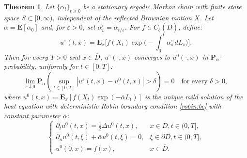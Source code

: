 \documentclass[10pt,a4paper]{amsart}
\newtheorem{theorem}{Theorem}
\begin{document}
\begin{theorem}\label{thm:averaging}
	Let $\{\alpha_t\}_{t\geq 0}$ be a stationary ergodic Markov chain with finite state space $S \subset [0, \infty)$, independent of the reflected Brownian motion $X$. Let $\bar\alpha=\mathbf E[\alpha_0]$ and, for $\varepsilon>0$, set $\alpha^\varepsilon_t=\alpha_{t/\varepsilon}$. For $f\in C_b(\overline D)$, define:
	\[
	u^\varepsilon(t,x)=\mathbf E_x\Big[f(X_t)\exp\Big(-\int_0^t\alpha^\varepsilon_s\,dL_s\Big)\Big].
	\]
	Then for every $T>0$ and $x\in\overline D$, $u^\varepsilon(\cdot,x)$ converges to $u^0(\cdot,x)$ in $\mathbf{P}_\alpha$-probability, uniformly for $t \in [0,T]$:
	\[
	\lim_{\varepsilon\downarrow 0} \mathbf{P}_\alpha \left( \sup_{t \in [0,T]} |u^\varepsilon(t,x) - u^0(t,x)| > \delta \right) = 0 \quad \text{for every } \delta > 0,
	\]
	where $u^0(t,x)=\mathbf{E}_x[f(X_t) \exp(-\bar \alpha L_t)]$ is the unique mild solution of the heat equation with deterministic Robin boundary condition \eqref{robin:bc} with constant parameter $\bar\alpha$:
	\begin{equation}\label{P_alphabar}
		\begin{cases}
			\partial_t u^0(t,x) = \tfrac{1}{2}\Delta u^0(t,x), & x \in D, t \in (0,T], \\
			\partial_n u^0(t,\xi) + \bar \alpha u^0(t,\xi) = 0, & \xi \in \partial D, t \in (0,T], \\
			u^0(0,x) = f(x), & x \in \overline{D}.
		\end{cases}
	\end{equation}
	
\end{theorem}
\end{document}
